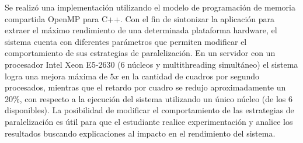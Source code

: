 Se realizó una implementación utilizando el modelo de programación de memoria
compartida OpenMP para C++. Con el fin de sintonizar la aplicación para extraer
el máximo rendimiento de una determinada plataforma hardware, el sistema cuenta
con diferentes parámetros que permiten modificar el comportamiento de sus
estrategias de paralelización. En un servidor con un procesador Intel Xeon
E5-2630 (6 núcleos y multithreading simultáneo) el sistema logra una mejora
máxima de $5x$ en la cantidad de cuadros por segundo procesados, mientras que el
retardo por cuadro se redujo aproximadamente un 20\%, con respecto a la
ejecución del sistema utilizando un único núcleo (de los 6 disponibles). La
posibilidad de modificar el comportamiento de las estrategias de paralelización
es útil para que el estudiante realice experimentación y analice los resultados
buscando explicaciones al impacto en el rendimiento del sistema.

\vfill
\pagebreak

